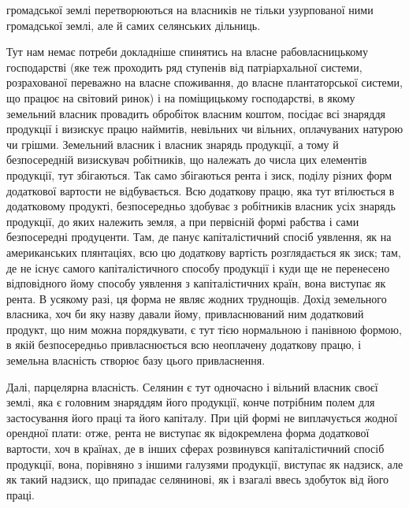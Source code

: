 \parcont{}  %
громадської землі перетворюються на власників не тільки узурпованої ними
громадської землі, але й самих селянських дільниць.

Тут нам немає потреби докладніше спинятись на власне рабовласницькому
господарстві (яке теж проходить ряд ступенів від патріархальної системи, розрахованої
переважно на власне споживання, до власне плантаторської системи,
що працює на світовий ринок) і на поміщицькому господарстві, в якому земельний
власник провадить обробіток власним коштом, посідає всі знаряддя
продукції і визискує працю наймитів, невільних чи вільних, оплачуваних натурою
чи грішми. Земельний власник і власник знарядь продукції, а тому й
безпосередній визискувач робітників, що належать до числа цих елементів продукції,
тут збігаються. Так само збігаються рента і зиск, поділу різних форм
додаткової вартости не відбувається. Всю додаткову працю, яка тут втілюється
в додатковому продукті, безпосередньо здобуває з робітників власник усіх знарядь
продукції, до яких належить земля, а при первісній формі рабства і сами
безпосередні продуценти. Там, де панує капіталістичний спосіб уявлення, як
на американських плянтаціях, всю цю додаткову вартість розглядається як зиск;
там, де не існує самого капіталістичного способу продукції і куди ще не перенесено
відповідного йому способу уявлення з капіталістичних країн, вона
виступає як рента. В усякому разі, ця форма не являє жодних труднощів. Дохід
земельного власника, хоч би яку назву давали йому, привласнюваний ним
додатковий продукт, що ним можна порядкувати, є тут тією нормальною і панівною
формою, в якій безпосередньо привласнюється всю неоплачену додаткову
працю, і земельна власність створює базу цього привласнення.

Далі, парцелярна власність. Селянин є тут одночасно і вільний власник
своєї землі, яка є головним знаряддям його продукції, конче потрібним полем
для застосування його праці та його капіталу. При цій формі не виплачується
жодної орендної плати: отже, рента не виступає як відокремлена форма додаткової
вартости, хоч в країнах, де в інших сферах розвинувся капіталістичний
спосіб продукції, вона, порівняно з іншими галузями продукції, виступає як
надзиск, але як такий надзиск, що припадає селянинові, як і взагалі ввесь здобуток
від його праці.

